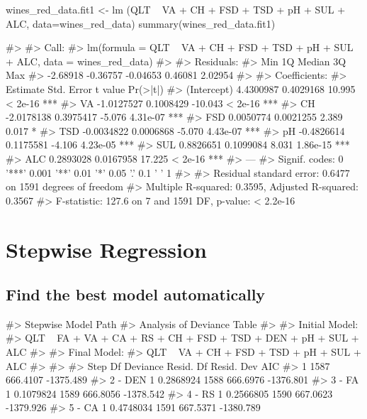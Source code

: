 \begin{Schunk}
\begin{Sinput}
wines_red_data.fit1 <- lm (QLT ~ VA + CH + FSD + TSD + pH + SUL + ALC,
                           data=wines_red_data)
summary(wines_red_data.fit1)
\end{Sinput}
\begin{Soutput}
#> 
#> Call:
#> lm(formula = QLT ~ VA + CH + FSD + TSD + pH + SUL + ALC, data = wines_red_data)
#> 
#> Residuals:
#>      Min       1Q   Median       3Q      Max 
#> -2.68918 -0.36757 -0.04653  0.46081  2.02954 
#> 
#> Coefficients:
#>               Estimate Std. Error t value Pr(>|t|)    
#> (Intercept)  4.4300987  0.4029168  10.995  < 2e-16 ***
#> VA          -1.0127527  0.1008429 -10.043  < 2e-16 ***
#> CH          -2.0178138  0.3975417  -5.076 4.31e-07 ***
#> FSD          0.0050774  0.0021255   2.389    0.017 *  
#> TSD         -0.0034822  0.0006868  -5.070 4.43e-07 ***
#> pH          -0.4826614  0.1175581  -4.106 4.23e-05 ***
#> SUL          0.8826651  0.1099084   8.031 1.86e-15 ***
#> ALC          0.2893028  0.0167958  17.225  < 2e-16 ***
#> ---
#> Signif. codes:  0 '***' 0.001 '**' 0.01 '*' 0.05 '.' 0.1 ' ' 1
#> 
#> Residual standard error: 0.6477 on 1591 degrees of freedom
#> Multiple R-squared:  0.3595, Adjusted R-squared:  0.3567 
#> F-statistic: 127.6 on 7 and 1591 DF,  p-value: < 2.2e-16
\end{Soutput}
\end{Schunk}

\hypertarget{stepwise-regression}{%
\section{Stepwise Regression}\label{stepwise-regression}}

\hypertarget{find-the-best-model-automatically}{%
\subsection{Find the best model
automatically}\label{find-the-best-model-automatically}}

\begin{Schunk}
\begin{Soutput}
#> Stepwise Model Path 
#> Analysis of Deviance Table
#> 
#> Initial Model:
#> QLT ~ FA + VA + CA + RS + CH + FSD + TSD + DEN + pH + SUL + ALC
#> 
#> Final Model:
#> QLT ~ VA + CH + FSD + TSD + pH + SUL + ALC
#> 
#> 
#>    Step Df  Deviance Resid. Df Resid. Dev       AIC
#> 1                         1587   666.4107 -1375.489
#> 2 - DEN  1 0.2868924      1588   666.6976 -1376.801
#> 3  - FA  1 0.1079824      1589   666.8056 -1378.542
#> 4  - RS  1 0.2566805      1590   667.0623 -1379.926
#> 5  - CA  1 0.4748034      1591   667.5371 -1380.789
\end{Soutput}
\end{Schunk}


